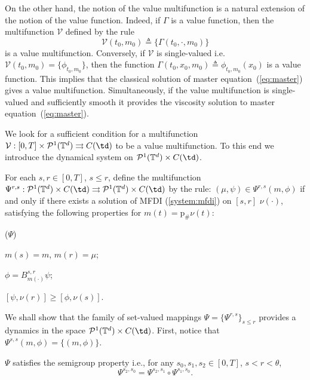 \documentclass[a4paper,12pt]{article}
\newcommand{\ptd}{\mathcal{P}^1(\mathbb{T}^d)}
\begin{document}
\begin{remark}
	On the other hand, the notion of the value multifunction is a natural extension of the notion of the value function. Indeed, if $\Gamma$ is a value function, then the multifunction $\mathcal{V}$ defined by the rule 
	\begin{equation}\label{intro:multifunction_by_function}
	\mathcal{V}(t_0,m_0)\triangleq \{\Gamma(t_0,\cdot,m_0)\}
	\end{equation} is a value multifunction. Conversely, if $\mathcal{V}$ is single-valued i.e. $\mathcal{V}(t_0,m_0)=\{\phi_{t_0,m_0}\}$, then the function $\Gamma(t_0,x_0,m_0)\triangleq \phi_{t_0,m_0}(x_0)$ is a value function. This implies that the classical solution of master equation~(\ref{eq:master}) gives a value multifunction. Simultaneously, if the value multifunction is single-valued and sufficiently smooth it provides the viscosity solution to master equation~(\ref{eq:master}).
\end{remark}

We look for  a sufficient condition for a multifunction $\mathcal{V}:[0,T]\times\ptd\rightrightarrows C(\td)$ to be a value multifunction. To this end we introduce the dynamical system on $\ptd\times C(\td)$.

\begin{definition}\label{def:flow} For each $s,r\in [0,T]$, $s\leq r$, define the multifunction $\Psi^{r,s}:\ptd\times C(\td)\rightrightarrows \ptd\times C(\td)$ by the rule: $(\mu,\psi)\in \Psi^{r,s}(m,\phi)$ if and only if  there exists a solution of MFDI (\ref{system:mfdi}) on $[s,r]$ $\nu(\cdot)$, satisfying the following properties  for $m(t)=\mathrm{p}_\#\nu(t)$:
	\begin{list}{($\Psi$)}{}
		\item\label{psi_cond:init_bound} $m(s)=m$, $m(r)=\mu$;
		\item\label{psi_cond:B} $\phi=B^{s,r}_{m(\cdot)}\psi$;
		\item\label{psi_cond:int_ineq} $[\psi,\nu(r)]\geq [\phi,\nu(s)]$.
	\end{list} 
\end{definition} 
We shall show that the family of set-valued mappings $\Psi=\{\Psi^{r,s}\}_{s\leq r}$ provides  a dynamics in the space $\ptd\times C(\td)$. First, notice that $\Psi^{s,s}(m,\phi)=\{(m,\phi)\}$. 



\begin{proposition}\label{prop:semigroup} $\Psi$ satisfies the semigroup property i.e., for any $s_0,s_1,s_2\in [0,T]$, $s<r<\theta$,
	$$\Psi^{s_2,s_0}=\Psi^{s_2,s_1}\circ\Psi^{s_1,s_0}. $$
\end{proposition}
\end{document}

